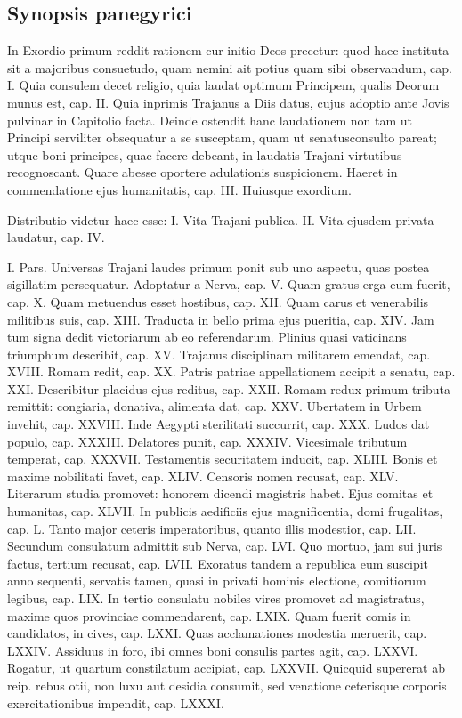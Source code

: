 \subsection*{Synopsis panegyrici}
{\noindent
In Exordio primum reddit rationem cur initio Deos precetur: quod haec instituta sit a majoribus consuetudo, quam nemini ait potius quam sibi observandum, cap. I. Quia consulem decet religio, quia laudat optimum Principem, qualis Deorum munus est, cap. II. Quia inprimis Trajanus a Diis datus, cujus adoptio ante Jovis pulvinar in Capitolio facta. Deinde ostendit hanc laudationem non tam ut Principi serviliter obsequatur a se susceptam, quam ut senatusconsulto pareat; utque boni principes, quae facere debeant, in laudatis Trajani virtutibus recognoscant. Quare abesse oportere adulationis suspicionem. Haeret in commendatione ejus humanitatis, cap. III. Huiusque exordium. 

Distributio videtur haec esse: I. Vita Trajani publica. II. Vita ejusdem privata laudatur, cap. IV. 

I. Pars. Universas Trajani laudes primum ponit sub uno aspectu, quas postea sigillatim persequatur. Adoptatur a Nerva, cap. V. Quam gratus erga eum fuerit, cap. X. Quam metuendus esset hostibus, cap. XII. Quam carus et venerabilis militibus suis, cap. XIII. Traducta in bello prima ejus pueritia, cap. XIV. Jam tum signa dedit victoriarum ab eo referendarum. Plinius quasi vaticinans triumphum describit, cap. XV. Trajanus disciplinam militarem emendat, cap. XVIII. Romam redit, cap. XX. Patris patriae appellationem accipit a senatu, cap. XXI. Describitur placidus ejus reditus, cap. XXII. Romam redux primum tributa remittit: congiaria, donativa, alimenta dat, cap. XXV. Ubertatem in Urbem invehit, cap. XXVIII. Inde Aegypti sterilitati succurrit, cap. XXX. Ludos dat populo, cap. XXXIII. Delatores punit, cap. XXXIV. Vicesimale tributum temperat, cap. XXXVII. Testamentis securitatem inducit, cap. XLIII. Bonis et maxime nobilitati favet, cap. XLIV. Censoris nomen recusat, cap. XLV. Literarum studia promovet: honorem dicendi magistris habet. Ejus comitas et humanitas, cap. XLVII. In publicis aedificiis ejus magnificentia, domi frugalitas, cap. L. Tanto major ceteris imperatoribus, quanto illis modestior, cap. LII. Secundum consulatum admittit sub Nerva, cap. LVI. Quo mortuo, jam sui juris factus, tertium recusat, cap. LVII. Exoratus tandem a republica eum suscipit anno sequenti, servatis tamen, quasi in privati hominis electione, comitiorum legibus, cap. LIX. In tertio consulatu nobiles vires promovet ad magistratus, maxime quos provinciae commendarent, cap. LXIX. Quam fuerit comis in candidatos, in cives, cap. LXXI. Quas acclamationes modestia meruerit, cap. LXXIV. Assiduus in foro, ibi omnes boni consulis partes agit, cap. LXXVI. Rogatur, ut quartum constilatum accipiat, cap. LXXVII. Quicquid supererat ab reip. rebus otii, non luxu aut desidia consumit, sed venatione ceterisque corporis exercitationibus impendit, cap. LXXXI. 

}
